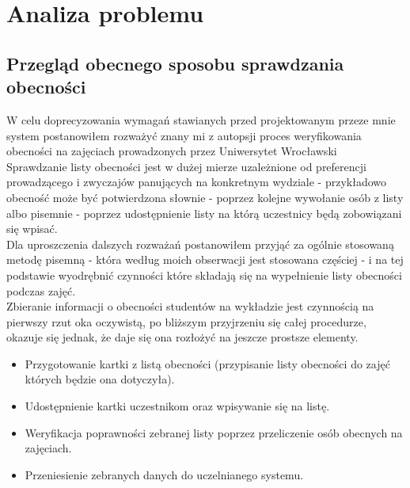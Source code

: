 \documentclass[declaration,shortabstract, mgr]{iithesis}
\begin{document}
\chapter{Analiza problemu}
\section{Przegląd obecnego sposobu sprawdzania obecności}
\indent W celu doprecyzowania wymagań stawianych przed projektowanym przeze mnie system postanowiłem rozważyć znany mi z autopsji proces weryfikowania obecności na zajęciach prowadzonych przez Uniwersytet Wrocławski\\
\indent Sprawdzanie listy obecności jest w dużej mierze uzależnione od preferencji prowadzącego i zwyczajów panujących na konkretnym wydziale - przykładowo obecność może być potwierdzona słownie - poprzez kolejne wywołanie osób z listy albo pisemnie - poprzez udostępnienie listy na którą uczestnicy będą zobowiązani się wpisać.\\
\indent Dla uproszczenia dalszych rozważań postanowiłem przyjąć za ogólnie stosowaną metodę pisemną - która według moich obserwacji jest stosowana częściej - i na tej podstawie wyodrębnić czynności które składają się na wypełnienie listy obecności podczas zajęć.\\
\indent Zbieranie informacji o obecności studentów na wykładzie jest czynnością na pierwszy rzut oka oczywistą, po bliższym przyjrzeniu się całej procedurze, okazuje się jednak, że daje się ona rozłożyć na jeszcze prostsze elementy. \\

\begin{itemize}
\item Przygotowanie kartki z listą obecności (przypisanie listy obecności do zajęć których będzie ona dotyczyła).
\item Udostępnienie kartki uczestnikom oraz wpisywanie się na listę.
\item Weryfikacja poprawności zebranej listy poprzez przeliczenie osób obecnych na zajęciach.
\item Przeniesienie zebranych danych do uczelnianego systemu.
\end{itemize}
\end{document}
